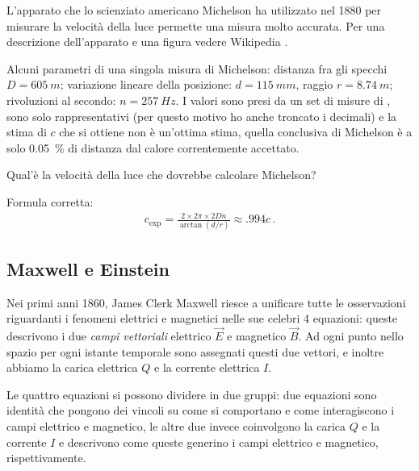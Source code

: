 \documentclass[a4paper,12pt]{article}
\begin{document}
\begin{exo}


L'apparato che lo scienziato americano Michelson ha utilizzato nel 1880 \cite[]{michelsonExperimentalDeterminationVelocity1880} per misurare la velocità della luce permette una misura molto accurata.
Per una descrizione dell'apparato e una figura vedere Wikipedia \cite[figura 3]{wikipediacontributorsFizeauFoucaultApparatus2019}.

Alcuni parametri di una singola misura di Michelson: distanza fra gli specchi \(D = \SI{605}{m}\); variazione lineare della posizione: \(d = \SI{115}{mm}\), raggio \(r = \SI{8.74}{m}\); rivoluzioni al secondo: \(n = \SI{257}{Hz}\). I valori sono presi da un set di misure di \textcite[]{michelsonExperimentalDeterminationVelocity1880}, sono solo rappresentativi (per questo motivo ho anche troncato i decimali) e la stima di \(c\) che si ottiene non è un'ottima stima, quella conclusiva di Michelson è a solo \SI{.05}{\percent} di distanza dal calore correntemente accettato.

Qual'è la velocità della luce che dovrebbe calcolare Michelson?

Formula corretta: 
%
\begin{align}
c _{\text{exp}} = \frac{2 \times 2 \pi \times 2 D n}{\arctan(d / r)} \approx \num{.994} c
\,.
\end{align}
\end{exo}

\subsection{Maxwell e Einstein}

Nei primi anni 1860, James Clerk Maxwell riesce a unificare tutte le osservazioni riguardanti i fenomeni elettrici e magnetici nelle sue celebri 4 equazioni: queste descrivono i due \emph{campi vettoriali} elettrico \(\vec{E}\) e magnetico \(\vec{B}\). 
Ad ogni punto nello spazio per ogni istante temporale sono assegnati questi due vettori, e inoltre abbiamo la carica elettrica \(Q\) e la corrente elettrica \(I\). 

Le quattro equazioni si possono dividere in due gruppi: due equazioni sono identità che pongono dei vincoli su come si comportano e come interagiscono i campi elettrico e magnetico, le altre due invece coinvolgono la carica \(Q\) e la corrente \(I\) e descrivono come queste generino i campi elettrico e magnetico, rispettivamente. 
\end{document}
